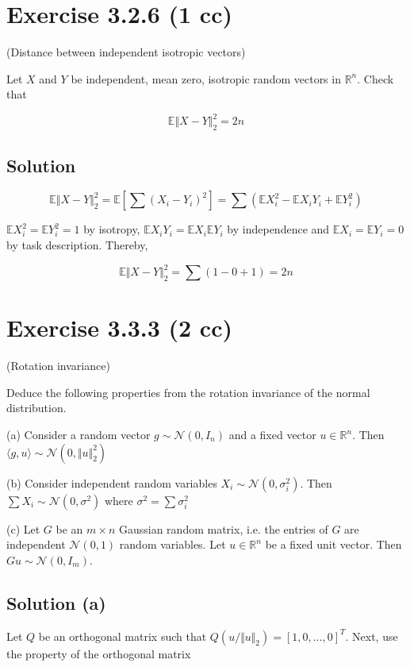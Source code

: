 \documentclass{article}
\begin{document}
\section{Exercise 3.2.6 (1 cc)}
(Distance between independent isotropic vectors)

Let $X$ and $Y$ be independent, mean zero, isotropic random vectors in $\mathbb R^n$. Check that

$$\mathbb E \Vert X - Y \Vert^2_2 = 2n$$

\subsection{Solution}

$$\mathbb E \Vert X - Y \Vert^2_2 = \mathbb E \left[\sum (X_i - Y_i)^2\right] = \sum (\mathbb E X_i^2 - \mathbb E X_iY_i + \mathbb E Y_i^2)$$

$\mathbb E X_i^2 = \mathbb E Y_i^2 = 1$ by isotropy, $\mathbb E X_i Y_i = \mathbb E X_i\mathbb E Y_i$ by independence and $\mathbb EX_i = \mathbb E Y_i = 0$ by task description. Thereby,

$$\mathbb E \Vert X - Y \Vert^2_2 = \sum (1 - 0 + 1) = 2n$$

\section{ Exercise 3.3.3 (2 cc) }

(Rotation invariance)

Deduce the following properties from the rotation invariance of the normal distribution.

(a) Consider a random vector $g \sim \mathcal N(0,I_n)$ and a fixed vector $u \in \mathbb R^n$. Then $ \langle g, u \rangle \sim \mathcal N(0, \Vert u \Vert^2_2)$

(b) Consider independent random variables $X_i \sim \mathcal N(0,\sigma_i^2)$. Then $\sum X_i \sim \mathcal N(0, \sigma^2)$ where $\sigma^2 = \sum \sigma_i^2$

(c) Let $G$ be an $m \times n$ Gaussian random matrix, i.e. the entries of $G$ are independent $\mathcal N(0,1)$ random variables. Let $u \in \mathbb R^n$ be a fixed unit vector. Then $Gu \sim \mathcal N(0, I_m)$.

\subsection{Solution (a)}

Let $Q$ be an orthogonal matrix such that $Q({u}/{\Vert u \Vert_2}) = [1, 0, \dots, 0]^T$. Next, use the property of the orthogonal matrix
\end{document}
